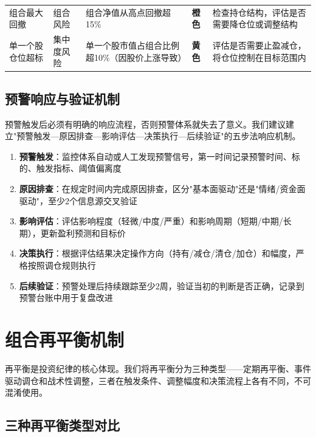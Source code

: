 \begin{exhibitbox}[表9-12：核心预警指标与阈值设定]
\begin{tabularx}{\linewidth}{l l l >{\centering\arraybackslash}p{2.5em} >{\raggedright\arraybackslash}X}
\rowcolor{riskamber!6}
组合最大回撤 & 组合风险 & 组合净值从高点回撤超15\% & \cellcolor{riskamber!25}\textbf{橙色} & 检查持仓结构，评估是否需要降仓位或调整结构 \\
\rowcolor{riskgreen!6}
单一个股仓位超标 & 集中度风险 & 单一个股市值占组合比例超10\%（因股价上涨导致） & \cellcolor{riskgreen!25}\textbf{黄色} & 评估是否需要止盈减仓，将仓位控制在目标范围内 \\
\bottomrule
\end{tabularx}
\end{exhibitbox}

\subsection{预警响应与验证机制}

预警触发后必须有明确的响应流程，否则预警体系就失去了意义。我们建议建立"预警触发—原因排查—影响评估—决策执行—后续验证"的五步法响应机制。

\begin{keyinsight}[预警响应五步法]
\begin{enumerate}[leftmargin=1.8em]
\item \textbf{预警触发}：监控体系自动或人工发现预警信号，第一时间记录预警时间、标的、触发指标、阈值偏离度
\item \textbf{原因排查}：在规定时间内完成原因排查，区分"基本面驱动"还是"情绪/资金面驱动"，至少2个信息源交叉验证
\item \textbf{影响评估}：评估影响程度（轻微/中度/严重）和影响周期（短期/中期/长期），更新盈利预测和目标价
\item \textbf{决策执行}：根据评估结果决定操作方向（持有/减仓/清仓/加仓）和幅度，严格按照调仓规则执行
\item \textbf{后续验证}：预警处理后持续跟踪至少2周，验证当初的判断是否正确，记录到预警台账中用于复盘改进
\end{enumerate}
\end{keyinsight}

\section{组合再平衡机制}

再平衡是投资纪律的核心体现。我们将再平衡分为三种类型——定期再平衡、事件驱动调仓和战术性调整，三者在触发条件、调整幅度和决策流程上各有不同，不可混淆使用。

\subsection{三种再平衡类型对比}

